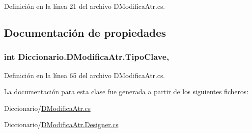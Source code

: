 Definición en la línea 21 del archivo D\-Modifica\-Atr.\-cs.



\subsection{Documentación de propiedades}
\hypertarget{class_diccionario_1_1_d_modifica_atr_a78cadbd3fd8653a5aea436f94d671bff}{
\subsubsection[{Tipo\-Clave}]{\setlength{\rightskip}{0pt plus 5cm}int Diccionario.\-D\-Modifica\-Atr.\-Tipo\-Clave\hspace{0.3cm}{\ttfamily [get]}, {\ttfamily [set]}}}\label{class_diccionario_1_1_d_modifica_atr_a78cadbd3fd8653a5aea436f94d671bff}


Definición en la línea 65 del archivo D\-Modifica\-Atr.\-cs.



La documentación para esta clase fue generada a partir de los siguientes ficheros\-:\begin{DoxyCompactItemize}
\item 
Diccionario/\hyperlink{_d_modifica_atr_8cs}{D\-Modifica\-Atr.\-cs}\item 
Diccionario/\hyperlink{_d_modifica_atr_8_designer_8cs}{D\-Modifica\-Atr.\-Designer.\-cs}\end{DoxyCompactItemize}

